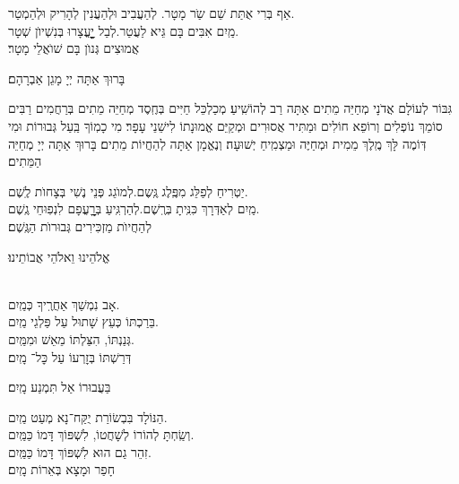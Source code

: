 \documentclass[twoside, openany, parskip=half, 11pt]{book}
\begin{document}
אַף בְּרִי אֻתַּת שֵׁם שַֹר מָטָר. \hfill לְהַעֲבִיב וּלְהַעֲנִין לְהָרִיק וּלְהַמְטַר.\\
מַֽיִם אִבִּים בָּם גֵּיא לַעֲטַר.\hfill לְבַל יׇׇׇׇׇׇׇעֳצָרוּ בְּנִשְׁיוׂן שְׁטָר.\\
אֲמוּצִים גְּנוׂן בָּם שׁוׂאֲלֵי מָטָר׃



בָּרוּךְ אַתָּה יְיָ מָגֵן אַבְרָהָם׃

גִּבּוֹר לְעוֹלָם אֲדֹנָי מְחַיֵּה מֵתִים אַתָּה רַב לְהוֹשִֽׁיעַ׃ מְכַלְכֵּל חַיִּים בְּחֶֽסֶד מְחַיֵּה מֵתִים בְּרַחֲמִים רַבִּים סוֹמֵךְ נוֹפְלִים וְרוֹפֵא חוֹלִים וּמַתִּיר אֲסוּרִים וּמְקַיֵּם אֱמוּנָתוֹ לִישֵׁנֵי עָפָר׃ מִי כָמֽוֹךָ בַּֽעַל גְּבוּרוֹת וּמִי דּֽוֹמֶה לָּךְ מֶֽלֶךְ מֵמִית וּמְחַיֶּה וּמַצְמִֽיחַ יְשׁוּעָה׃ וְנֶאֱמָן אַתָּה לְהַחֲיוֹת מֵתִים׃ בָּרוּךְ אַתָּה יְיָ מְחַיֵּה הַמֵּתִים׃





יַטְרִיחַ לְפַלֵּג מִפֶּֽלֶג גֶּֽשֶם.\hfill לְמוׂגֵג פְּנֵי נֶשִׁי בְּצָחוׂת לֶֽשֶׁם.\\
מַֽיִם לְאַדְּרָךְ כִּנִּֽיתָ בְּרֶֽשֶׁם.\hfill לְהַרְגִּֽיעַ בְּרׇׇׇׇׇעֳפָם לִנְפֽוּחֵי גֶֽשֶׁם.\\
לְהַחֲיוׂת מַזְכִּירִים גְּבוּרוׂת הַגֶּֽשֶׁם׃


\begin{small}אֱלֹהֵינוּ וֵאלֹהֵי אֲבוֹתֵינוּ׃\end{small}\\

 אָב נִמְשַׁךְ אַחֲרֶֽיךָ \hfill כְּמַֽיִם.\\
בֵּרַכְתּוֹ כְּעֵץ שָׁתוּל עַל פַּלְגֵי \hfill מַֽיִם.\\
גְּנַנְתּוֹ, הִצַּלְתּוֹ מֵאֵשׁ \hfill וּמִמַּֽיִם.\\
דְּרַשְׁתּוֹ בְּזׇרְעוֹ עַל כׇּל־ \hfill מָֽיִם׃

\kahal
 בַּעֲבוּרוֹ אַל תִּמְנַע מָֽיִם׃

 הַנּוֹלָד בִּבְשׂוֹרַת יֻקַּח־נָא מְעַט \hfill מַֽיִם.\\
וְשַֽׂחְתָּ לְהוֹרוֹ לְשָׁחֲטוֹ, לִשְׁפּוֹךְ דָּמוֹ \hfill כַּמַּֽיִם.\\
זִהֵר גַם הוּא לִשְׁפּוֹךְ דָּמוֹ \hfill כַּמַּֽיִם.\\
חָפַר וּמָצָא בְּאֵרוֹת \hfill מָֽיִם׃
\end{document}
